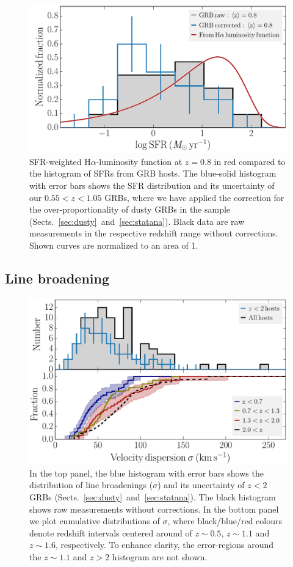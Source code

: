 \documentclass[traditabstract, longauth]{aa}
\newcommand{\ha}{H$\alpha$}
\begin{document}
\begin{figure}
\includegraphics[angle=0, width=0.99\columnwidth]{Figs/SFRvsLFHa.pdf}
\caption{ {SFR-weighted \ha-luminosity function at $z=0.8$ \citep{2011ApJ...726..109L} in red compared to the histogram of SFRs from GRB hosts. The blue-solid histogram with error bars shows the SFR distribution and its uncertainty of our $0.55 < z < 1.05$ GRBs, where we have applied the correction for the over-proportionality of dusty GRBs in the sample (Sects.~\ref{sec:dusty}~and~\ref{sec:statana}). Black data are raw measurements in the respective redshift range without corrections. Shown curves are normalized to an area of 1.}}
\label{fig:sfrhalpha}
\end{figure}

\subsection{Line broadening}
\label{sec:velo}

\begin{figure}
\includegraphics[angle=0, width=0.99\columnwidth]{Figs/Velo_histogram.pdf}
\caption{In the top panel, the blue histogram with error bars shows the distribution of line broadenings ($\sigma$) and its uncertainty of $z < 2$ GRBs (Sects.~\ref{sec:dusty}~and~\ref{sec:statana}). The black histogram shows raw measurements without corrections. In the bottom panel we plot cumulative distributions of $\sigma$, where black/blue/red colours denote redshift intervals centered around of $z\sim0.5$, $z\sim1.1$ and $z\sim1.6$, respectively. To enhance clarity, the error-regions around the $z\sim1.1$ and $z>2$ histogram are not shown.}
\label{fig:velohist}
\end{figure}
\end{document}
